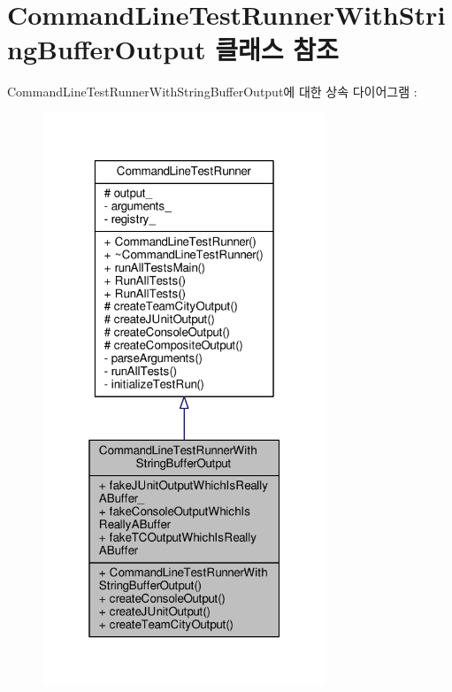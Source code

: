 \hypertarget{class_command_line_test_runner_with_string_buffer_output}{}\section{Command\+Line\+Test\+Runner\+With\+String\+Buffer\+Output 클래스 참조}
\label{class_command_line_test_runner_with_string_buffer_output}


Command\+Line\+Test\+Runner\+With\+String\+Buffer\+Output에 대한 상속 다이어그램 \+: 
\nopagebreak
\begin{figure}[H]
\begin{center}
\leavevmode
\includegraphics[width=241pt]{class_command_line_test_runner_with_string_buffer_output__inherit__graph}
\end{center}
\end{figure}


